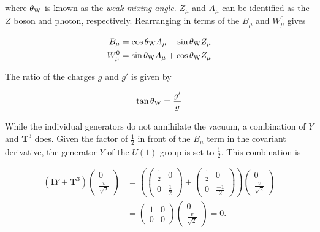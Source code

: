 \documentclass{article}
\begin{document}
where $\theta_{\rm{W}}$ is known as the \textit{weak mixing angle}. $Z_\mu$ and $A_\mu$ can be identified as the $Z$ boson and photon, respectively. Rearranging in terms of the $B_\mu$ and $W^{0}_\mu$ gives

\begin{equation}
\begin{split}
B_\mu & = \cos\theta_{\rm{W}} A_\mu - \sin\theta_{\rm{W}}Z_\mu \\
W^{0}_\mu & = \sin\theta_{\rm{W}} A_\mu + \cos\theta_{\rm{W}}Z_\mu\\
\end{split}
\end{equation}

The ratio of the charges $g$ and $g'$ is given by 

\begin{equation}
\tan\theta_{\rm{W}} = \frac{g'}{g}
\end{equation}

While the individual generators do not annihilate the vacuum, a combination of $Y$ and $\bm{T}^{3}$ does. Given the factor of $\frac{1}{2}$ in front of the $B_\mu$ term in the covariant derivative, the generator $Y$ of the $U(1)$ group is set to $\frac{1}{2}$. This combination is 

\begin{equation}
\begin{split}
\left( \bm{I}Y + \bm{T}^3 \right)\left(\begin{matrix}0 \\ \frac{v}{\sqrt{2}} \end{matrix}\right) & = \left(\left(\begin{matrix} \frac{1}{2} & 0 \\ 0 & \frac{1}{2} \end{matrix}\right) + \left(\begin{matrix}\frac{1}{2} & 0 \\ 0 & \frac{-1}{2}\end{matrix}\right)\right)\left(\begin{matrix}0 \\ \frac{v}{\sqrt{2}}\end{matrix}\right) \\
& = \left( \begin{matrix} 1 & 0 \\ 0 & 0 \end{matrix} \right)\left(\begin{matrix}0\\            \frac{v}{\sqrt{2}}\end{matrix} \right) = 0.
\end{split}
\end{equation}
\end{document}
